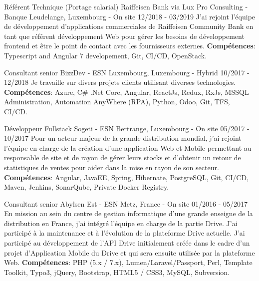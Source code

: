 \begin{cventries}
  \cventry
    {Référent Technique (Portage salarial)} %
    {Raiffeisen Bank via Lux Pro Consulting - Banque} %
    {Leudelange, Luxembourg - On site} %
    {12/2018 - 03/2019} %
    {
      J'ai rejoint l'équipe de développement d'applications commerciales de Raiffeisen 
      Community Bank en tant que référent développement Web pour gérer les besoins de 
      développement frontend et être le point de contact avec les fournisseurs externes.
      \newline
      \textbf{Compétences}: Typescript and Angular 7 developement, Git, CI/CD, OpenStack.
    }

  \cventry
    {Consultant senior} %
    {BizzDev - ESN} %
    {Luxembourg, Luxembourg - Hybrid} %
    {10/2017 - 12/2018} %
    {
      Je travaille sur divers projets clients utilisant diverses technologies.
      \newline
      \textbf{Compétences}: Azure, C\# .Net Core, Angular, ReactJs, Redux, RxJs, MSSQL Administration, Automation AnyWhere (RPA), Python, Odoo, Git, TFS, CI/CD.
    }

  \cventry
    {Développeur Fullstack} %
    {Sogeti - ESN} %
    {Bertrange, Luxembourg - On site} %
    {05/2017 - 10/2017} %
    {
      Pour un acteur majeur de la grande distribution mondial, j'ai rejoint l'équipe en 
      charge de la création d'une application Web et Mobile permettant au responsable 
      de site et de rayon de gérer leurs stocks et d'obtenir un retour de statistiques 
      de ventes pour aider dans la mise en rayon de son secteur.
      \newline
      \textbf{Compétences}: Angular, JavaEE, Spring, Hibernate, PostgreSQL, Git, CI/CD, Maven, Jenkins, SonarQube, Private Docker Registry.
    }

  \cventry
    {Consultant senior} %
    {Abylsen Est - ESN} %
    {Metz, France - On site} %
    {01/2016 - 05/2017} %
    {
      En mission au sein du centre de gestion informatique d'une grande enseigne de la 
      distribution en France, j'ai intégré l'équipe en charge de la partie Drive.
      \newline
      J'ai participé à la maintenance et à l'évolution de la plateforme Drive actuelle.
      \newline
      J'ai participé au développement de l'API Drive initialement créée dans le cadre 
      d'un projet d'Application Mobile du Drive et qui sera ensuite utilisée par la 
      plateforme Web.
      \newline
      \textbf{Compétences}: PHP (5.x / 7.x), Lumen/Laravel/Passport, Perl, Template Toolkit, Typo3, jQuery, Bootstrap, HTML5 / CSS3, MySQL, Subversion.
    }


\end{cventries}
